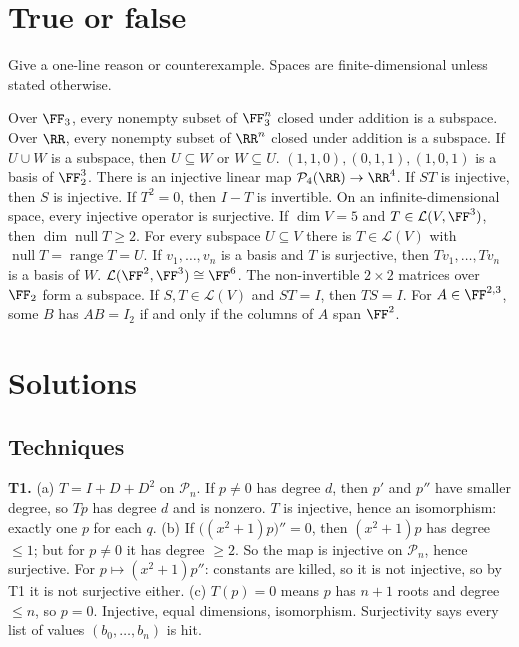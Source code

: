 \documentclass[11pt]{scrartcl}
\DeclareMathOperator{\nul}{null}
\DeclareMathOperator{\range}{range}
\newcommand{\LL}{\mathcal L}
\newcommand{\PP}{\mathcal P}
\begin{document}
\section{True or false}
Give a one-line reason or counterexample. Spaces are finite-dimensional unless stated otherwise.
\begin{enumerate}
  \ii Over $\FF_3$, every nonempty subset of $\FF_3^n$ closed under addition is a subspace.
  \ii Over $\RR$, every nonempty subset of $\RR^n$ closed under addition is a subspace.
  \ii If $U\cup W$ is a subspace, then $U\subseteq W$ or $W\subseteq U$.
  \ii $(1,1,0),(0,1,1),(1,0,1)$ is a basis of $\FF_2^3$.
  \ii There is an injective linear map $\PP_4(\RR)\to\RR^4$.
  \ii If $ST$ is injective, then $S$ is injective.
  \ii If $T^2=0$, then $I-T$ is invertible.
  \ii On an infinite-dimensional space, every injective operator is surjective.
  \ii If $\dim V=5$ and $T\in\LL(V,\FF^3)$, then $\dim\nul T\ge2$.
  \ii For every subspace $U\subseteq V$ there is $T\in\LL(V)$ with $\nul T=\range T=U$.
  \ii If $v_1,\dots,v_n$ is a basis and $T$ is surjective, then $Tv_1,\dots,Tv_n$ is a basis of $W$.
  \ii $\LL(\FF^2,\FF^3)\cong\FF^6$.
  \ii The non-invertible $2\times2$ matrices over $\FF_2$ form a subspace.
  \ii If $S,T\in\LL(V)$ and $ST=I$, then $TS=I$.
  \ii For $A\in\FF^{2,3}$, some $B$ has $AB=I_2$ if and only if the columns of $A$ span $\FF^2$.
\end{enumerate}

\newpage
\section{Solutions}\label{sec:sol}

\subsection*{Techniques}
\textbf{T1.}
(a) $T=I+D+D^2$ on $\PP_n$. If $p\ne0$ has degree $d$, then $p'$ and $p''$ have smaller degree, so $Tp$ has degree $d$ and is nonzero. $T$ is injective, hence an isomorphism: exactly one $p$ for each $q$.
(b) If $\big((x^2+1)p\big)''=0$, then $(x^2+1)p$ has degree $\le1$; but for $p\ne0$ it has degree $\ge2$. So the map is injective on $\PP_n$, hence surjective. For $p\mapsto(x^2+1)p''$: constants are killed, so it is not injective, so by T1 it is not surjective either.
(c) $T(p)=0$ means $p$ has $n+1$ roots and degree $\le n$, so $p=0$. Injective, equal dimensions, isomorphism. Surjectivity says every list of values $(b_0,\dots,b_n)$ is hit.
\end{document}
